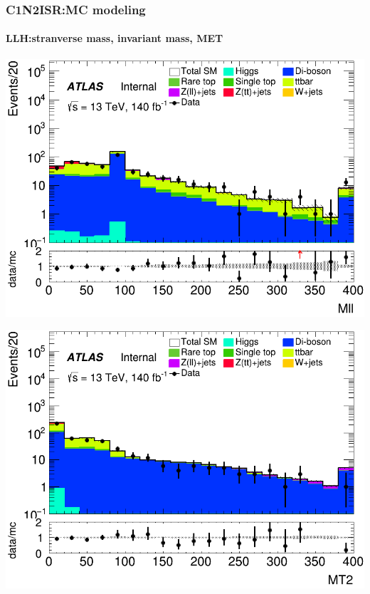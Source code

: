 \documentclass[usenames,dvipsnames]{beamer}
\begin{document}
\begin{frame}
\frametitle{C1N2ISR:MC modeling}
\framesubtitle{LLH:\quad stranverse mass, invariant mass, MET}
    \begin{minipage}{0.32\textwidth}
        \centering
        \includegraphics[width=\textwidth]{graphics/LLH_met/LLH_met_Mll.png}
    \end{minipage}
    \hfill
    \begin{minipage}{0.32\textwidth}
        \centering
        \includegraphics[width=\textwidth]{graphics/LLH_met/LLH_met_MT2.png}
    \end{minipage}
    \hfill
    

\end{frame}
\end{document}
